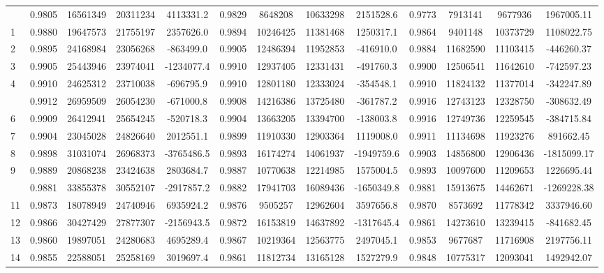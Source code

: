 \documentclass[
  12pt,
]{article}
\begin{document}
\begin{longtable}[t]{lcccccccccccc}
\endfoot
\bottomrule
\endlastfoot
0 & 0.9805 & 16561349 & 20311234 & 4113331.2 & 0.9829 & 8648208 & 10633298 & 2151528.6 & 0.9773 & 7913141 & 9677936 & 1967005.11\\
1 & 0.9880 & 19647573 & 21755197 & 2357626.0 & 0.9894 & 10246425 & 11381468 & 1250317.1 & 0.9864 & 9401148 & 10373729 & 1108022.75\\
2 & 0.9895 & 24168984 & 23056268 & -863499.0 & 0.9905 & 12486394 & 11952853 & -416910.0 & 0.9884 & 11682590 & 11103415 & -446260.37\\
3 & 0.9905 & 25443946 & 23974041 & -1234077.4 & 0.9910 & 12937405 & 12331431 & -491760.3 & 0.9900 & 12506541 & 11642610 & -742597.23\\
4 & 0.9910 & 24625312 & 23710038 & -696795.9 & 0.9910 & 12801180 & 12333024 & -354548.1 & 0.9910 & 11824132 & 11377014 & -342247.89\\
\addlinespace
5 & 0.9912 & 26959509 & 26054230 & -671000.8 & 0.9908 & 14216386 & 13725480 & -361787.2 & 0.9916 & 12743123 & 12328750 & -308632.49\\
6 & 0.9909 & 26412941 & 25654245 & -520718.3 & 0.9904 & 13663205 & 13394700 & -138003.8 & 0.9916 & 12749736 & 12259545 & -384715.84\\
7 & 0.9904 & 23045028 & 24826640 & 2012551.1 & 0.9899 & 11910330 & 12903364 & 1119008.0 & 0.9911 & 11134698 & 11923276 & 891662.45\\
8 & 0.9898 & 31031074 & 26968373 & -3765486.5 & 0.9893 & 16174274 & 14061937 & -1949759.6 & 0.9903 & 14856800 & 12906436 & -1815099.17\\
9 & 0.9889 & 20868238 & 23424638 & 2803684.7 & 0.9887 & 10770638 & 12214985 & 1575004.5 & 0.9893 & 10097600 & 11209653 & 1226695.44\\
\addlinespace
10 & 0.9881 & 33855378 & 30552107 & -2917857.2 & 0.9882 & 17941703 & 16089436 & -1650349.8 & 0.9881 & 15913675 & 14462671 & -1269228.38\\
11 & 0.9873 & 18078949 & 24740946 & 6935924.2 & 0.9876 & 9505257 & 12962604 & 3597656.8 & 0.9870 & 8573692 & 11778342 & 3337946.60\\
12 & 0.9866 & 30427429 & 27877307 & -2156943.5 & 0.9872 & 16153819 & 14637892 & -1317645.4 & 0.9861 & 14273610 & 13239415 & -841682.45\\
13 & 0.9860 & 19897051 & 24280683 & 4695289.4 & 0.9867 & 10219364 & 12563775 & 2497045.1 & 0.9853 & 9677687 & 11716908 & 2197756.11\\
14 & 0.9855 & 22588051 & 25258169 & 3019697.4 & 0.9861 & 11812734 & 13165128 & 1527279.9 & 0.9848 & 10775317 & 12093041 & 1492942.07\\

\end{longtable}
\end{document}
